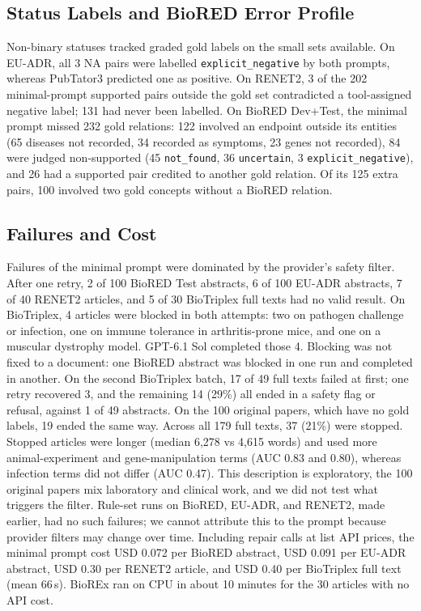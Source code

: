 \documentclass[preprint,10pt,letterpaper]{elsarticle}
\newcommand{\st}[1]{\texttt{#1}}             %
\begin{document}
\subsection{Status Labels and BioRED Error Profile}
Non-binary statuses tracked graded gold labels on the small sets available. On EU-ADR, all 3 NA pairs were labelled \st{explicit\_negative} by both prompts, whereas PubTator3 predicted one as positive. On RENET2, 3 of the 202 minimal-prompt supported pairs outside the gold set contradicted a tool-assigned negative label; 131 had never been labelled. On BioRED Dev+Test, the minimal prompt missed 232 gold relations: 122 involved an endpoint outside its entities (65 diseases not recorded, 34 recorded as symptoms, 23 genes not recorded), 84 were judged non-supported (45 \st{not\_found}, 36 \st{uncertain}, 3 \st{explicit\_negative}), and 26 had a supported pair credited to another gold relation. Of its 125 extra pairs, 100 involved two gold concepts without a BioRED relation.

\subsection{Failures and Cost}
Failures of the minimal prompt were dominated by the provider's safety filter. After one retry, 2 of 100 BioRED Test abstracts, 6 of 100 EU-ADR abstracts, 7 of 40 RENET2 articles, and 5 of 30 BioTriplex full texts had no valid result. On BioTriplex, 4 articles were blocked in both attempts: two on pathogen challenge or infection, one on immune tolerance in arthritis-prone mice, and one on a muscular dystrophy model. GPT-6.1 Sol completed those 4. Blocking was not fixed to a document: one BioRED abstract was blocked in one run and completed in another. On the second BioTriplex batch, 17 of 49 full texts failed at first; one retry recovered 3, and the remaining 14 (29\%) all ended in a safety flag or refusal, against 1 of 49 abstracts. On the 100 original papers, which have no gold labels, 19 ended the same way. Across all 179 full texts, 37 (21\%) were stopped. Stopped articles were longer (median 6,278 vs 4,615 words) and used more animal-experiment and gene-manipulation terms (AUC 0.83 and 0.80), whereas infection terms did not differ (AUC 0.47). This description is exploratory, the 100 original papers mix laboratory and clinical work, and we did not test what triggers the filter. Rule-set runs on BioRED, EU-ADR, and RENET2, made earlier, had no such failures; we cannot attribute this to the prompt because provider filters may change over time. Including repair calls at list API prices, the minimal prompt cost USD 0.072 per BioRED abstract, USD 0.091 per EU-ADR abstract, USD 0.30 per RENET2 article, and USD 0.40 per BioTriplex full text (mean 66\,s). BioREx ran on CPU in about 10 minutes for the 30 articles with no API cost.
\end{document}
